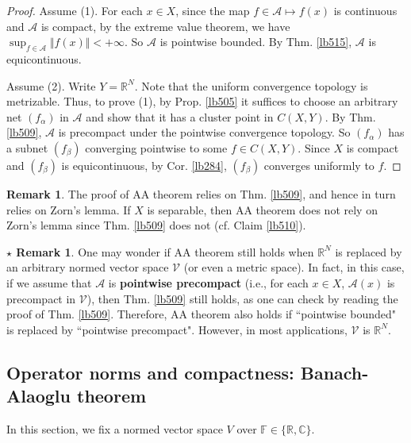 \documentclass[12pt,b5paper,notitlepage]{article}
\theoremstyle{definition}
\newtheorem{rem}[df]{Remark}
\newtheorem{srem}[df]{$\star$ Remark}
\theoremstyle{plain}
\newcommand{\mc}{\mathcal}
\newcommand{\scr}{\mathscr}
\newcommand{\Cbb}{\mathbb C}
\newcommand{\Rbb}{\mathbb R}
\newcommand{\Fbb}{\mathbb F}
\numberwithin{equation}{section}
\begin{document}


\begin{proof}
Assume (1). For each $x\in X$, since the map $f\in\scr A\mapsto f(x)$ is continuous and $\scr A$ is compact, by the extreme value theorem, we have $\sup_{f\in\scr A}\Vert f(x)\Vert<+\infty$. So $\scr A$ is pointwise bounded. By Thm. \ref{lb515}, $\scr A$ is equicontinuous.

Assume (2). Write $Y=\Rbb^N$. Note that the uniform convergence topology is metrizable. Thus, to prove (1), by Prop. \ref{lb505} it suffices to choose an arbitrary net $(f_\alpha)$ in $\scr A$ and show that it has a cluster point in $C(X,Y)$. By Thm. \ref{lb509}, $\scr A$ is precompact under the pointwise convergence topology. So $(f_\alpha)$ has a subnet $(f_\beta)$ converging pointwise to some $f\in C(X,Y)$. Since $X$ is compact and $(f_\beta)$ is equicontinuous, by Cor. \ref{lb284}, $(f_\beta)$ converges uniformly to $f$. 
\end{proof}


\begin{rem}
The proof of AA theorem relies on Thm. \ref{lb509}, and hence in turn relies on Zorn's lemma. If $X$ is separable, then AA theorem does not rely on Zorn's lemma since Thm. \ref{lb509} does not (cf. Claim \ref{lb510}).
\end{rem}

\begin{srem}
One may wonder if AA theorem still holds when $\Rbb^N$ is replaced by an arbitrary normed vector space $\mc V$ (or even a metric space). In fact, in this case, if we assume that $\scr A$ is \textbf{pointwise precompact} (i.e., for each $x\in X$, $\scr A(x)$ is precompact in $\mc V$), then Thm. \ref{lb509} still holds, as one can check by reading the proof of Thm. \ref{lb509}. Therefore, AA theorem also holds if ``pointwise bounded" is replaced by ``pointwise precompact". However, in most applications, $\mc V$ is $\Rbb^N$.
\end{srem}



\subsection{Operator norms and compactness: Banach-Alaoglu theorem}


In this section, we fix a normed vector space $V$ over $\Fbb\in\{\Rbb,\Cbb\}$.
\end{document}
